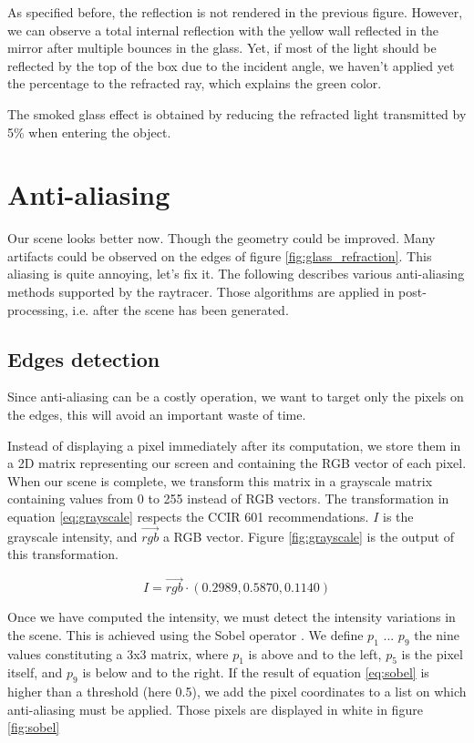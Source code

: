 As specified before, the reflection is not rendered in the previous figure. However, we can observe a total internal reflection with the yellow wall reflected in the mirror after multiple bounces in the glass. Yet, if most of the light should be reflected by the top of the box due to the incident angle, we haven't applied yet the percentage to the refracted ray, which explains the green color.

The smoked glass effect is obtained by reducing the refracted light transmitted by 5\% when entering the object.


\section{Anti-aliasing}
Our scene looks better now. Though the geometry could be improved. Many artifacts could be observed on the edges of figure \ref{fig:glass_refraction}. This aliasing is quite annoying, let's fix it. The following describes various anti-aliasing methods supported by the raytracer. Those algorithms are applied in post-processing, i.e. after the scene has been generated.

\subsection{Edges detection}
Since anti-aliasing can be a costly operation, we want to target only the pixels on the edges, this will avoid an important waste of time.

Instead of displaying a pixel immediately after its computation, we store them in a 2D matrix representing our screen and containing the RGB vector of each pixel. When our scene is complete, we transform this matrix in a grayscale matrix containing values from 0 to 255 instead of RGB vectors. The transformation in equation \ref{eq:grayscale} respects the CCIR 601 recommendations. $I$ is the grayscale intensity, and $\vec{rgb}$ a RGB vector. Figure \ref{fig:grayscale} is the output of this transformation.

\begin{equation}
I = \vec{rgb} \cdot (0.2989, 0.5870, 0.1140)
\label{eq:grayscale}
\end{equation}

Once we have computed the intensity, we must detect the intensity variations in the scene. This is achieved using the Sobel operator \cite{sobel19683x3}. We define $p_1$ ... $p_9$ the nine values constituting a 3x3 matrix, where $p_1$ is above and to the left, $p_5$ is the pixel itself, and $p_9$ is below and to the right. If the result of equation \ref{eq:sobel} is higher than a threshold (here 0.5), we add the pixel coordinates to a list on which anti-aliasing must be applied. Those pixels are displayed in white in figure \ref{fig:sobel}


